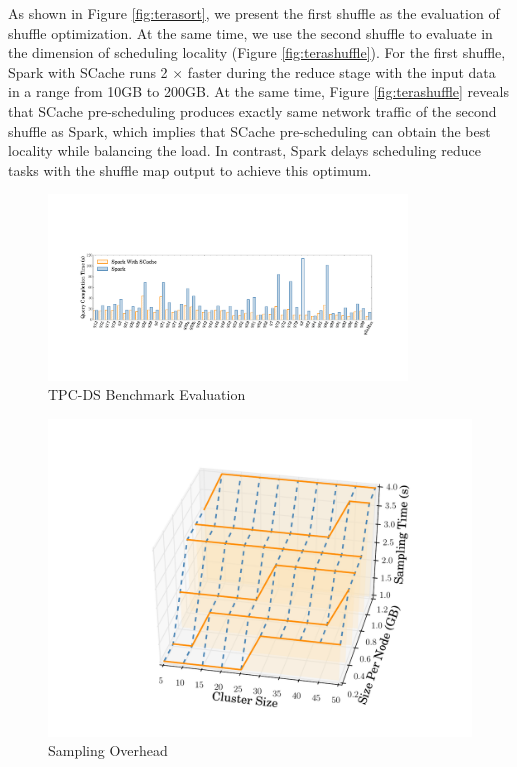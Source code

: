 As shown in Figure \ref{fig:terasort}, we present the first shuffle as the evaluation of shuffle optimization. At the same time, we use the second shuffle to evaluate in the dimension of scheduling locality (Figure \ref{fig:terashuffle}). For the first shuffle, Spark with SCache runs 2 $\times$ faster during the reduce stage with the input data in a range from 10GB to 200GB. At the same time, Figure \ref{fig:terashuffle} reveals that SCache pre-scheduling produces exactly same network traffic of the second shuffle as Spark, which implies that SCache pre-scheduling can obtain the best locality while balancing the load. In contrast, Spark delays scheduling reduce tasks with the shuffle map output to achieve this optimum.

\begin{figure}
	\centering
	\includegraphics[width=0.85\textwidth]{fig/tpcds}
	\caption{TPC-DS Benchmark Evaluation}
	\label{fig:tpcds}
	\vspace{-1em}
\end{figure}
\begin{figure}
	\centering
	\includegraphics[width=0.6\linewidth]{fig/sampling}
	\caption{Sampling Overhead}
	\label{fig:sampling}
	\vspace{-1em}
\end{figure}

